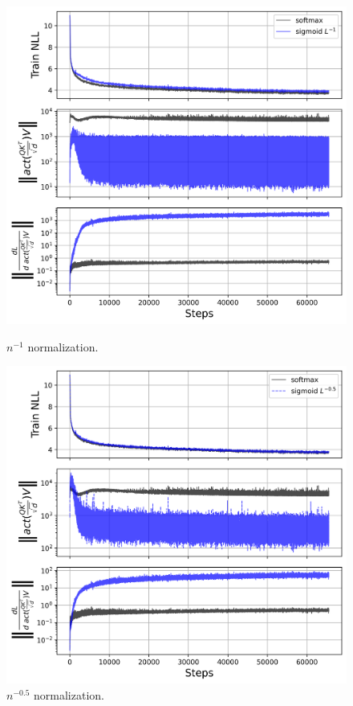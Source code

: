 \begin{figure}[htbp]
\begin{minipage}{0.31\textwidth}
        \includegraphics[width=\textwidth]{figures/attn_norm_seed1000001_softmax_vs_sigmoid_seq_len_normalized.png}
        \captionsetup{justification=centering}
        \caption{$n^{-1}$ normalization.}
        \label{fig:seq_len_scaling}
    \end{minipage}\hfill
    \begin{minipage}{0.31\textwidth}
        \centering
        \includegraphics[width=\textwidth]{figures/attn_norm_seed1000001_softmax_vs_sigmoid_sqrt_seq_len_normalized.png}
        \captionsetup{justification=centering}
        \caption{$n^{-0.5}$ normalization.}
        \label{fig:sqrt_scaling}
    \end{minipage}
\end{figure}
